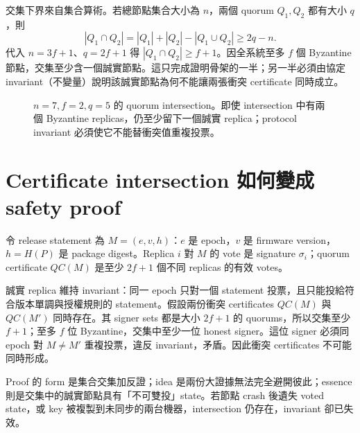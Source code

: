 \documentclass[11pt,a4paper,oneside,openany]{book}
\begin{document}
交集下界來自集合算術。若總節點集合大小為 $n$，兩個 quorum $Q_1,Q_2$ 都有大小 $q$，則
\[
 |Q_1\cap Q_2|
 =|Q_1|+|Q_2|-|Q_1\cup Q_2|
 \ge 2q-n.
\]
代入 $n=3f+1$、$q=2f+1$ 得 $|Q_1\cap Q_2|\ge f+1$。因全系統至多 $f$ 個 Byzantine 節點，交集至少含一個誠實節點。這只完成證明骨架的一半；另一半必須由協定 invariant（不變量）說明該誠實節點為何不能讓兩張衝突 certificate 同時成立。

\begin{figure}[htbp]
\centering
{}
\caption{$n=7,f=2,q=5$ 的 quorum intersection。即使 intersection 中有兩個 Byzantine replicas，仍至少留下一個誠實 replica；protocol invariant 必須使它不能替衝突值重複投票。}
\label{fig:quorum-intersection}
\end{figure}

\section{Certificate intersection 如何變成 safety proof}
令 release statement 為 $M=(e,v,h)$：$e$ 是 epoch，$v$ 是 firmware version，$h=H(P)$ 是 package digest。Replica $i$ 對 $M$ 的 vote 是 signature $\sigma_i$；quorum certificate $QC(M)$ 是至少 $2f+1$ 個不同 replicas 的有效 votes。

誠實 replica 維持 invariant：同一 epoch 只對一個 statement 投票，且只能投給符合版本單調與授權規則的 statement。假設兩份衝突 certificates $QC(M)$ 與 $QC(M')$ 同時存在。其 signer sets 都是大小 $2f+1$ 的 quorums，所以交集至少 $f+1$；至多 $f$ 位 Byzantine，交集中至少一位 honest signer。這位 signer 必須同 epoch 對 $M\ne M'$ 重複投票，違反 invariant，矛盾。因此衝突 certificates 不可能同時形成。

Proof 的 form 是集合交集加反證；idea 是兩份大證據無法完全避開彼此；essence 則是交集中的誠實節點具有「不可雙投」state。若節點 crash 後遺失 voted state，或 key 被複製到未同步的兩台機器，intersection 仍存在，invariant 卻已失效。
\end{document}
